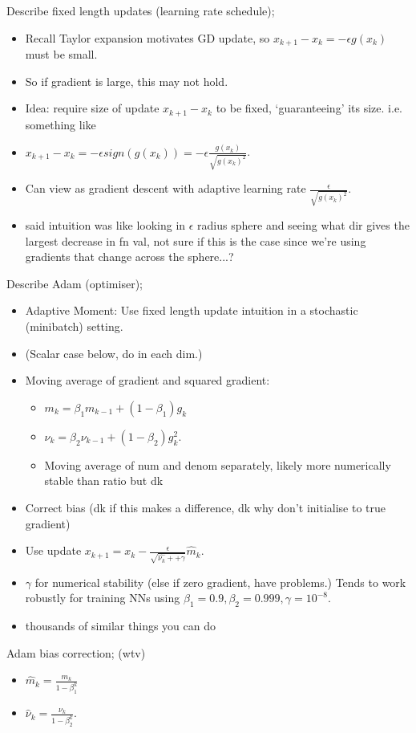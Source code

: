\documentclass{article}
\begin{document}
Describe fixed length updates (learning rate schedule); \begin{itemize} \item Recall Taylor expansion motivates GD update, so $x_{k+1}-x_k = -\epsilon g(x_k)$ must be small.  \item So if gradient is large, this may not hold.  \item Idea: require size of update $x_{k+1}-x_k$ to be fixed, `guaranteeing' its size. i.e. something like \item $x_{k+1}-x_k = -\epsilon sign (g(x_k))=-\epsilon \frac{g(x_k)}{\sqrt{g(x_k)^2}}$.  \item Can view as gradient descent with adaptive learning rate $\frac{\epsilon}{\sqrt{g(x_k)^2}}$.  \item said intuition was like looking in $\epsilon$ radius sphere and seeing what dir gives the largest decrease in fn val, not sure if this is the case since we're using gradients that change across the sphere...?  \end{itemize}

Describe Adam (optimiser); \begin{itemize} \item Adaptive Moment: Use fixed length update intuition in a stochastic (minibatch) setting.  \item (Scalar case below, do in each dim.) \item Moving average of gradient and squared gradient: \begin{itemize} \item $m_k = \beta_1m_{k-1}+(1-\beta_1)g_k$ \item $\nu_k = \beta_2\nu_{k-1} + (1-\beta_2)g_k^2$.  \item Moving average of num and denom separately, likely more numerically stable than ratio but dk \end{itemize} \item Correct bias (dk if this makes a difference, dk why don't initialise to true gradient) \item Use update $x_{k+1}=x_k - \frac{\epsilon}{\sqrt{\hat{\nu_k}++\gamma}}\hat{m}_k$.  \item $\gamma$ for numerical stability (else if zero gradient, have problems.) Tends to work robustly for training NNs using $\beta_1 = 0.9, \beta_2 = 0.999, \gamma = 10^{-8}$.  \item thousands of similar things you can do \end{itemize}

Adam bias correction; (wtv) \begin{itemize} \item $\hat{m}_k = \frac{m_k}{1-\beta^k_1}$ \item $\hat{\nu}_k = \frac{\nu_k}{1-\beta^k_2}$.  \end{itemize}
\end{document}

